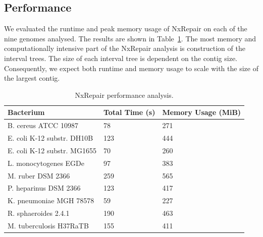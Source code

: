 \subsection{Performance}
We evaluated the runtime and peak memory usage of NxRepair on each of the nine genomes analysed. The results are shown in Table~\ref{tab:performance}. The most memory and computationally intensive part of the NxRepair analysis is construction of the interval trees. The size of each interval tree is dependent on the contig size. Consequently, we expect both runtime and memory usage to scale with the size of the largest contig. 

\begin{table}
\begin{center}
\caption{NxRepair performance analysis. \label{tab:performance}}
\begin{tabular}{lll}
    \hline
    Bacterium & Total Time (s) & Memory Usage (MiB) \\ \hline
    B. cereus ATCC 10987 & 78 & 271 \\
    E. coli K-12 substr. DH10B & 123 & 444 \\
    E. coli K-12 substr. MG1655 & 70 & 260 \\
    L. monocytogenes EGDe & 97 & 383 \\
    M. ruber DSM 2366 & 259 & 565 \\
    P. heparinus DSM 2366 & 123 & 417 \\
    K. pneumoniae MGH 78578 & 59 & 227 \\
    R. sphaeroides 2.4.1 & 190 & 463 \\
    M. tuberculosis H37RaTB & 155 & 411 \\ 
    \hline
\end{tabular}
\end{center}
\end{table}


